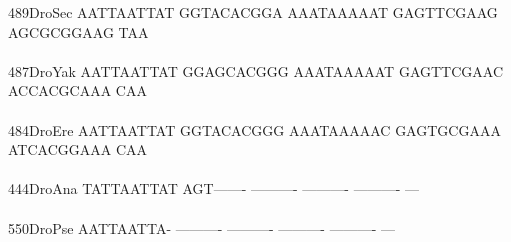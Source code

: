 \documentclass[11pt,twoside,reqno,a4paper]{article}
\begin{document}
{489\hspace*{1\charwidth}DroSec	AATTAATTAT	GGTACACGGA	AAATAAAAAT	GAGTTCGAAG	AGCGCGGAAG	TAA\\
\hspace*{4\charwidth}\hspace*{7\charwidth}\hspace*{1\charwidth}\hspace*{1\charwidth}\hspace*{1\charwidth}\hspace*{1\charwidth}\hspace*{1\charwidth}\\
487\hspace*{1\charwidth}DroYak	AATTAATTAT	GGAGCACGGG	AAATAAAAAT	GAGTTCGAAC	ACCACGCAAA	CAA\\
\hspace*{4\charwidth}\hspace*{7\charwidth}\hspace*{1\charwidth}\hspace*{1\charwidth}\hspace*{1\charwidth}\hspace*{1\charwidth}\hspace*{1\charwidth}\\
484\hspace*{1\charwidth}DroEre	AATTAATTAT	GGTACACGGG	AAATAAAAAC	GAGTGCGAAA	ATCACGGAAA	CAA\\
\hspace*{4\charwidth}\hspace*{7\charwidth}\hspace*{1\charwidth}\hspace*{1\charwidth}\hspace*{1\charwidth}\hspace*{1\charwidth}\hspace*{1\charwidth}\\
444\hspace*{1\charwidth}DroAna	TATTAATTAT	AGT-------	----------	----------	----------	---\\
\hspace*{4\charwidth}\hspace*{7\charwidth}\hspace*{1\charwidth}\hspace*{1\charwidth}\hspace*{1\charwidth}\hspace*{1\charwidth}\hspace*{1\charwidth}\\
550\hspace*{1\charwidth}DroPse	AATTAATTA-	----------	----------	----------	----------	---\\
}
\end{document}
